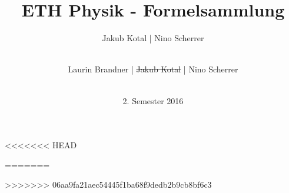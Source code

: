 \documentclass[a4paper, landscape]{article}
\begin{document}
\title{ETH Physik - Formelsammlung}
\date{2. Semester 2016}
<<<<<<< HEAD
\author{ Jakub Kotal | Nino Scherrer\\ \\}
=======
\author{Laurin Brandner | \st{Jakub Kotal} | Nino Scherrer\\ \\}
>>>>>>> 06aa9fa21aec54445f1ba68f9dedb2b9cb8bf6c3
\maketitle










\end{document}
